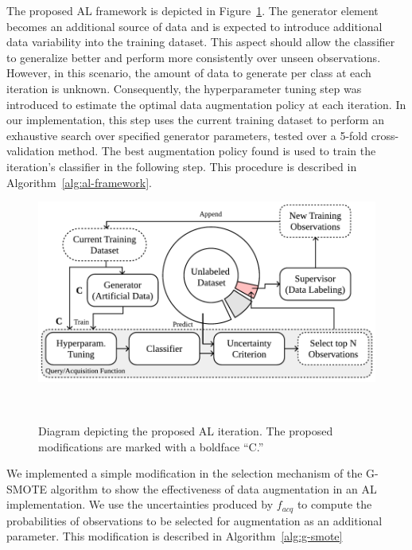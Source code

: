 \documentclass[10pt,journal,compsoc]{IEEEtran}
\begin{document}
The proposed AL framework is depicted in Figure~\ref{fig:al_proposed}. The
generator element becomes an additional source of data and is expected to
introduce additional data variability into the training dataset. This aspect
should allow the classifier to generalize better and perform more consistently
over unseen observations. However, in this scenario, the amount of data to
generate per class at each iteration is unknown. Consequently, the
hyperparameter tuning step was introduced to estimate the optimal data
augmentation policy at each iteration. In our implementation, this step uses
the current training dataset to perform an exhaustive search over specified
generator parameters, tested over a 5-fold cross-validation method. The best
augmentation policy found is used to train the iteration's classifier in the
following step. This procedure is described in
Algorithm~\ref{alg:al-framework}.


\begin{figure}[H]
	\centering
	\includegraphics[width=\linewidth]{../analysis/al_proposed}
    \caption{%
        Diagram depicting the proposed AL iteration. The proposed
        modifications are marked with a boldface ``C.''
    }~\label{fig:al_proposed}
\end{figure}

We implemented a simple modification in the selection mechanism of the G-SMOTE
algorithm to show the effectiveness of data augmentation in an AL
implementation. We use the uncertainties produced by $f_{acq}$ to compute the
probabilities of observations to be selected for augmentation as an additional
parameter. This modification is described in Algorithm~\ref{alg:g-smote} 
\end{document}
